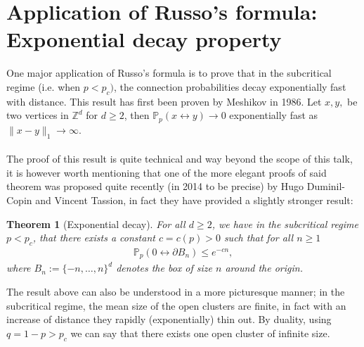 \documentclass[12pt,a4paper]{article}
\newtheorem{thm}{Theorem}[section]
\theoremstyle{definition}
\begin{document}
\section{Application of Russo's formula: Exponential decay property}
One major application of Russo's formula is to prove that in the subcritical regime (i.e. when $p < p_c)$, the connection probabilities decay exponentially fast with distance. This result has first been proven by Meshikov in 1986. Let $x,y,$ be two vertices in $\mathbb{Z}^d$ for $d \geq 2$, then $\mathbb{P}_p( x \leftrightarrow y ) \to 0$ exponentially fast as $\|x - y \|_1 \to \infty$. \\
\\
The proof of this result is quite technical and way beyond the scope of this talk, it is however worth mentioning that one of the more elegant proofs of said theorem was proposed quite recently (in 2014 to be precise) by Hugo Duminil-Copin and Vincent Tassion, in fact they have provided a slightly stronger result: 
\begin{thm}[Exponential decay] For all $d \geq 2$, we have in the subcritical regime $p < p_c$, that there exists a constant $c=c(p) >0$ such that for all $n \geq 1$ 
\begin{align*}
\mathbb{P}_p( 0 \leftrightarrow \partial B_n)  \leq e^{-cn},
\end{align*}
where $B_n:= \{-n, \dots , n\}^d$ denotes the box of size $n$ around the origin.
\end{thm}
The result above can also be understood in a more picturesque manner; in the subcritical regime, the mean size of the open clusters are finite, in fact with an increase of distance they rapidly (exponentially) thin out. By duality, using $q=1-p > p_c$ we can say that there exists one open cluster of infinite size. 
\end{document}
